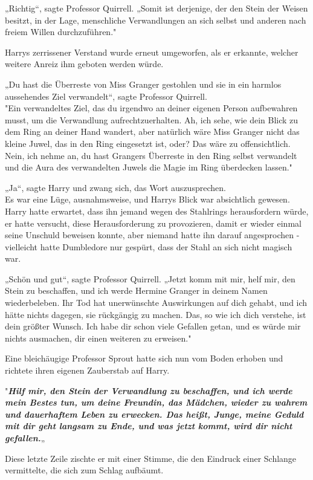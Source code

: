 {„Richtig“, sagte Professor Quirrell. „Somit ist derjenige, der den Stein der Weisen besitzt, in der Lage, menschliche Verwandlungen an sich selbst und anderen nach freiem Willen durchzuführen."

Harrys zerrissener Verstand wurde erneut umgeworfen, als er erkannte, welcher weitere Anreiz ihm geboten werden würde.

„Du hast die Überreste von Miss Granger gestohlen und sie in ein harmlos aussehendes Ziel verwandelt“, sagte Professor Quirrell.\\ "Ein verwandeltes Ziel, das du irgendwo an deiner eigenen Person aufbewahren musst, um die Verwandlung aufrechtzuerhalten. Ah, ich sehe, wie dein Blick zu dem Ring an deiner Hand wandert, aber natürlich wäre Miss Granger nicht das kleine Juwel, das in den Ring eingesetzt ist, oder? Das wäre zu offensichtlich. Nein, ich nehme an, du hast Grangers Überreste in den Ring selbst verwandelt und die Aura des verwandelten Juwels die Magie im Ring überdecken lassen."

„Ja“, sagte Harry und zwang sich, das Wort auszusprechen.\\ Es war eine Lüge, ausnahmsweise, und Harrys Blick war absichtlich gewesen. Harry hatte erwartet, dass ihn jemand wegen des Stahlrings herausfordern würde, er hatte versucht, diese Herausforderung zu provozieren, damit er wieder einmal seine Unschuld beweisen konnte, aber niemand hatte ihn darauf angesprochen - vielleicht hatte Dumbledore nur gespürt, dass der Stahl an sich nicht magisch war.

„Schön und gut“, sagte Professor Quirrell. „Jetzt komm mit mir, helf mir, den Stein zu beschaffen, und ich werde Hermine Granger in deinem Namen wiederbeleben. Ihr Tod hat unerwünschte Auswirkungen auf dich gehabt, und ich hätte nichts dagegen, sie rückgängig zu machen. Das, so wie ich dich verstehe, ist dein größter Wunsch. Ich habe dir schon viele Gefallen getan, und es würde mir nichts ausmachen, dir einen weiteren zu erweisen."

Eine bleichäugige Professor Sprout hatte sich nun vom Boden erhoben und richtete ihren eigenen Zauberstab auf Harry.

"\textbf{\emph{Hilf mir, den Stein der Verwandlung zu beschaffen, und ich werde mein Bestes tun, um deine Freundin, das Mädchen, wieder zu wahrem und dauerhaftem Leben zu erwecken. Das heißt, Junge, meine Geduld mit dir geht langsam zu Ende, und was jetzt kommt, wird dir nicht gefallen.}}„

Diese letzte Zeile zischte er mit einer Stimme, die den Eindruck einer Schlange vermittelte, die sich zum Schlag aufbäumt.

}
